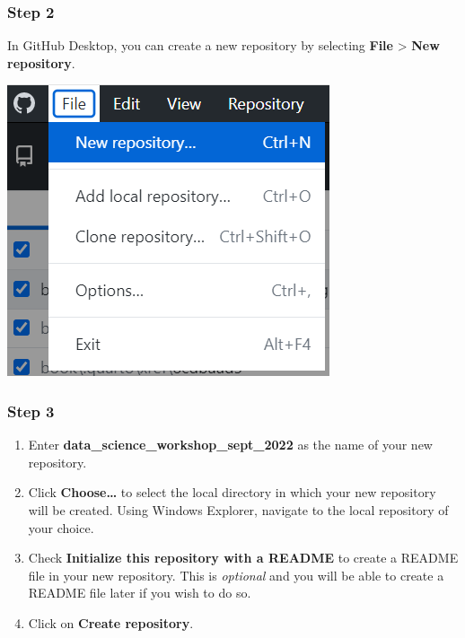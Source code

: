 \documentclass[
  letterpaper,
  DIV=11,
  numbers=noendperiod]{scrreprt}
\providecommand{\tightlist}{%
  \setlength{\itemsep}{0pt}\setlength{\parskip}{0pt}}\usepackage{longtable,booktabs,array}
\begin{document}
\hypertarget{step-2}{%
\subsubsection{Step 2}\label{step-2}}

In GitHub Desktop, you can create a new repository by selecting
\textbf{File} \textgreater{} \textbf{New repository}.

\includegraphics{./images/paste-A85BE0C6.png}

\hypertarget{step-3}{%
\subsubsection{Step 3}\label{step-3}}

\begin{enumerate}
\def\labelenumi{\arabic{enumi}.}
\tightlist
\item
  Enter \textbf{data\_science\_workshop\_sept\_2022} as the name of your
  new repository.
\item
  Click \textbf{Choose\ldots{}} to select the local directory in which
  your new repository will be created. Using Windows Explorer, navigate
  to the local repository of your choice.
\item
  Check \textbf{Initialize this repository with a README} to create a
  README file in your new repository. This is \emph{optional} and you
  will be able to create a README file later if you wish to do so.
\item
  Click on \textbf{Create repository}.
\end{enumerate}
\end{document}
